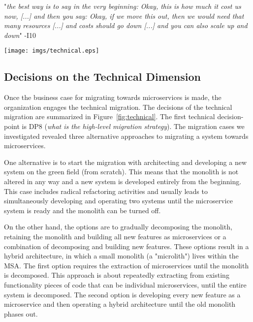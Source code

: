 \documentclass[sigconf,dvipsnames]{acmart}
\newcommand{\interviewquote}[2]{
 \def\FrameCommand{%
    \hspace{0pt}%
    {\color{MidnightBlue}\vrule width 1.5pt}%
    {\color{white}\vrule width 4pt}%
    \colorbox{white}
  }%
  \MakeFramed{\advance\hsize-\width\FrameRestore}%
  \noindent\hspace{-4.55pt}%
  \footnotesize{"\emph{#1}" -{#2}}\vspace{0.5pt}\endMakeFramed%
}
\begin{document}
\interviewquote{the best way is to say in the very beginning: Okay, this is how much it cost us now, [...] and then you say: Okay, if we move this out, then we would need that many resources [...] and costs should go down [...] and you can also scale up and down}{I10}
\vspace{-1em}


\begin{figure*}[h!]
  \centering
  \texttt{[image: imgs/technical.eps]}
  \caption{Technical decisions for migrating towards microservices}
  \label{fig:technical}
\end{figure*}

\subsection{Decisions on the Technical Dimension}
\label{sec:tech}

Once the business case for migrating towards microservices is made, the organization engages the technical migration. The decisions of the technical migration are summarized in Figure~\ref{fig:technical}. The first technical decision-point is DP8 (\emph{what is the high-level migration strategy}).
The migration cases we investigated revealed three alternative approaches to migrating a system towards microservices.


One alternative is to start the migration with architecting and developing a new system on the green field (from scratch).
This means that the monolith is not altered in any way and a new system is developed entirely from the beginning.
This case includes radical refactoring activities and usually leads to simultaneously developing and operating two systems until the microservice system is ready and the monolith can be turned off. 

On the other hand, the options are to gradually decomposing the monolith, retaining the monolith and building all new features as microservices or a combination of decomposing and building new features. 
These options result in a hybrid architecture, in which a small monolith (a "microlith") lives within the MSA.
The first option requires the extraction of microservices until the monolith is decomposed. This approach is about repeatedly extracting from existing functionality pieces of code that can be individual microservices, until the entire system is decomposed.
The second option is developing every new feature as a microservice and then operating a hybrid architecture until the old monolith phases out.
\end{document}
